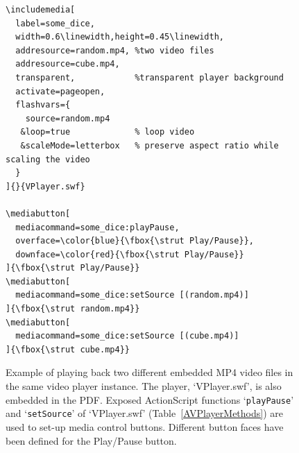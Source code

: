 \documentclass[a4paper]{article}
\begin{document}
\begin{figure}[bp]
\centering
\begin{Verbatim}
\includemedia[
  label=some_dice,
  width=0.6\linewidth,height=0.45\linewidth,
  addresource=random.mp4, %two video files
  addresource=cube.mp4,
  transparent,            %transparent player background
  activate=pageopen,
  flashvars={
    source=random.mp4
   &loop=true             % loop video
   &scaleMode=letterbox   % preserve aspect ratio while scaling the video
  }
]{}{VPlayer.swf}

\mediabutton[
  mediacommand=some_dice:playPause,
  overface=\color{blue}{\fbox{\strut Play/Pause}},
  downface=\color{red}{\fbox{\strut Play/Pause}}
]{\fbox{\strut Play/Pause}}
\mediabutton[
  mediacommand=some_dice:setSource [(random.mp4)]
]{\fbox{\strut random.mp4}}
\mediabutton[
  mediacommand=some_dice:setSource [(cube.mp4)]
]{\fbox{\strut cube.mp4}}
\end{Verbatim}
\vspace{1ex}
\caption{Example of playing back two different embedded MP4 video files in the same video player instance. The player, `VPlayer.swf', is also embedded in the PDF. Exposed ActionScript functions `{\tt playPause}' and `{\tt setSource}' of `VPlayer.swf' (Table~\ref{AVPlayerMethods}) are used to set-up media control buttons. Different button faces have been defined for the Play/Pause button.}\label{videoa}
\end{figure}
\end{document}
